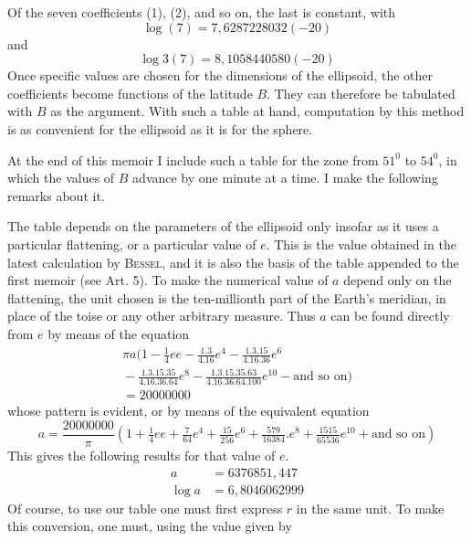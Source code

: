 %
Of the seven coefficients (1), (2), and so on, the last is constant, with
\[
\log(7)=7{,}6287228032(-20)
\]
and
\[
\log3(7)=8{,}1058440580(-20)
\]
Once specific values are chosen for the dimensions of the ellipsoid, the other coefficients become functions of the latitude \(B\). They can therefore be tabulated with \(B\) as the argument. With such a table at hand, computation by this method is as convenient for the ellipsoid as it is for the sphere.

At the end of this memoir I include such a table for the zone from \(51^0\) to \(54^0\), in which the values of \(B\) advance by one minute at a time. I make the following remarks about it.

The table depends on the parameters of the ellipsoid only insofar as it uses a particular flattening, or a particular value of \(e\). This is the value obtained in the latest calculation by \textsc{Bessel}, and it is also the basis of the table appended to the first memoir (see Art. 5). To make the numerical value of \(a\) depend only on the flattening, the unit chosen is the ten-millionth part of the Earth’s meridian, in place of the toise or any other arbitrary measure. Thus \(a\) can be found directly from \(e\) by means of the equation
\[
\begin{aligned}
\pi a(1-\tfrac14ee-\frac{1\mathord{.}3}{4\mathord{.}16}e^4-\frac{1\mathord{.}3\mathord{.}15}{4\mathord{.}16\mathord{.}36}e^6\\
{}-\frac{1\mathord{.}3\mathord{.}15\mathord{.}35}{4\mathord{.}16\mathord{.}36\mathord{.}64}e^8
-\frac{1\mathord{.}3\mathord{.}15\mathord{.}35\mathord{.}63}{4\mathord{.}16\mathord{.}36\mathord{.}64\mathord{.}100}e^{10}-\text{and so on})\\
=20000000
\end{aligned}
\]
whose pattern is evident, or by means of the equivalent equation
\[
a=\frac{20000000}{\pi}(1+\tfrac14ee+\tfrac7{64}e^4+\tfrac{15}{256}e^6+\tfrac{579}{16384}\mathord{.}e^8+\tfrac{1515}{65536}e^{10}+\text{and so on})
\]
This gives the following results for that value of \(e\).
\[
\begin{aligned}
a&=6376851{,}447\\
\log a&=6{,}8046062999
\end{aligned}
\]
Of course, to use our table one must first express \(r\) in the same unit. To make this conversion, one must, using the value given by
